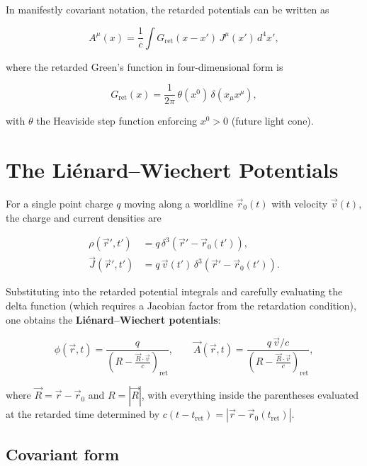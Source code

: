 In manifestly covariant notation, the retarded potentials can be written as

\begin{equation}
A^\mu(x) = \frac{1}{c}\int G_{\text{ret}}(x - x')\,J^\mu(x')\,d^4x',
\end{equation}

where the retarded Green's function in four-dimensional form is

\begin{equation}
G_{\text{ret}}(x) = \frac{1}{2\pi}\,\theta(x^0)\,\delta(x_\mu x^\mu),
\end{equation}

with $\theta$ the Heaviside step function enforcing $x^0 > 0$ (future light cone).

\section{The Li\'enard--Wiechert Potentials}

For a single point charge $q$ moving along a worldline $\vec{r}_0(t)$ with velocity $\vec{v}(t)$, the charge and current densities are

\begin{align}
\rho(\vec{r}',t') &= q\,\delta^3(\vec{r}' - \vec{r}_0(t')), \\
\vec{J}(\vec{r}',t') &= q\,\vec{v}(t')\,\delta^3(\vec{r}' - \vec{r}_0(t')).
\end{align}

Substituting into the retarded potential integrals and carefully evaluating the delta function (which requires a Jacobian factor from the retardation condition), one obtains the \textbf{Li\'enard--Wiechert potentials}:

\begin{equation}
\boxed{\phi(\vec{r},t) = \frac{q}{\left(R - \frac{\vec{R}\cdot\vec{v}}{c}\right)_{\text{ret}}}, \qquad \vec{A}(\vec{r},t) = \frac{q\,\vec{v}/c}{\left(R - \frac{\vec{R}\cdot\vec{v}}{c}\right)_{\text{ret}}},}
\end{equation}

where $\vec{R} = \vec{r} - \vec{r}_0$ and $R = |\vec{R}|$, with everything inside the parentheses evaluated at the retarded time determined by $c(t - t_{\text{ret}}) = |\vec{r} - \vec{r}_0(t_{\text{ret}})|$.

\subsection{Covariant form}

